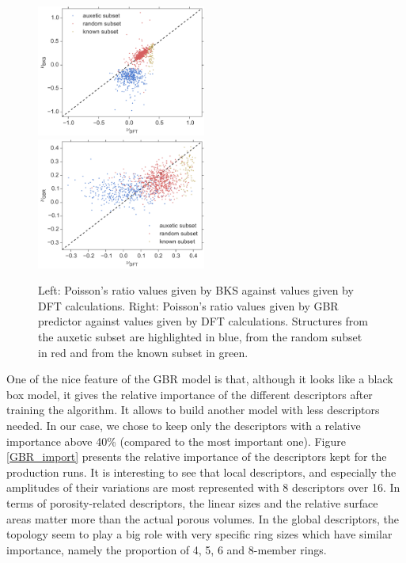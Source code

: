 \documentclass[journal=jacsat,manuscript=article]{achemso}
\begin{document}
\begin{figure}[ht!]\centering
\includegraphics[clip,trim=0cm 0cm 0cm 0cm,width=0.495\textwidth]{zeolite_study_8_1}
\includegraphics[clip,trim=0cm 0cm 0cm 0cm,width=0.495\textwidth]{zeolite_study_8_2}
\caption{Left: Poisson's ratio values given by BKS against values given by DFT calculations. Right: Poisson's ratio values given by GBR predictor against values given by DFT calculations. Structures from the auxetic subset are highlighted in blue, from the random subset in red and from the known subset in green.
\label{GBR_BKS_DFT_nu}}
\end{figure}
			
One of the nice feature of the GBR model is that, although it looks like a black box model, it gives the relative importance of the different descriptors after training the algorithm. It allows to build another model with less descriptors needed. In our case, we chose to keep only the descriptors with a relative importance above 40\% (compared to the most important one). Figure \ref{GBR_import} presents the relative importance of the descriptors kept for the production runs. It is interesting to see that local descriptors, and especially the amplitudes of their variations are most represented with 8 descriptors over 16. In terms of porosity-related descriptors, the linear sizes and the relative surface areas matter more than the actual porous volumes. In the global descriptors, the topology seem to play a big role with very specific ring sizes which have similar importance, namely the proportion of 4, 5, 6 and 8-member rings.
			
\end{document}
